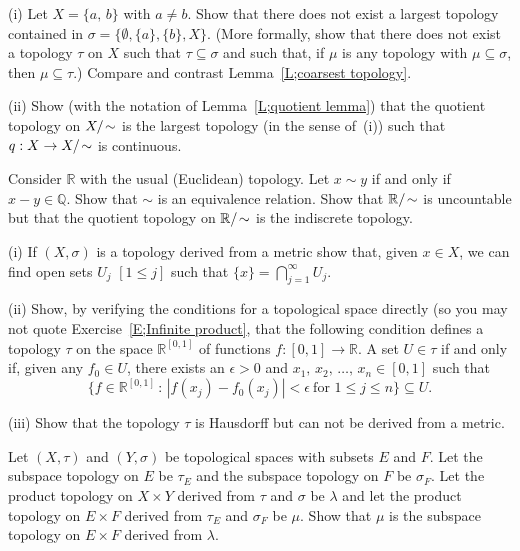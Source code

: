 \begin{exercise}\label{E;quotient remarks}
(i) Let $X=\{a,\,b\}$ with $a\neq b$. Show that there
does not exist a largest topology contained in 
$\sigma=\{\emptyset,\{a\},\{b\},X\}$. (More formally,
show that there does not exist a topology $\tau$
on $X$ such that $\tau\subseteq \sigma$ and
such that, if $\mu$ is any topology with $\mu\subseteq\sigma$,
then $\mu\subseteq \tau$.) Compare and contrast
Lemma~\ref{L;coarsest topology}.

(ii) Show (with the notation of Lemma~\ref{L;quotient lemma})
that the quotient topology on $X/\negthinspace\sim$ is the largest
topology (in the sense of~(i)) such that
$q:X\rightarrow X/\negthinspace\sim$ is continuous.
\end{exercise}
\begin{exercise}\label{E;quotient non Hausdorff}
Consider ${\mathbb R}$ with the usual (Euclidean)
topology. Let $x\sim y$ if and only if $x-y\in{\mathbb Q}$.
Show that $\sim$ is an equivalence relation. Show that
${\mathbb R}/\negthinspace\sim$ is uncountable but that the quotient
topology on ${\mathbb R}/\negthinspace\sim$ is the indiscrete topology.
\end{exercise}
\begin{exercise}\label{E;Hausdorff not metric}
(i) If $(X,\sigma)$ is a topology derived from a metric
show that, given $x\in X$, we can find open sets
$U_{j}$ $[1\leq j]$
such that $\{x\}=\bigcap_{j=1}^{\infty}U_{j}$.

(ii) Show, by verifying the conditions for a topological
space directly (so you may not quote Exercise~\ref{E;Infinite product}, 
that the following condition defines 
a topology $\tau$
on the space ${\mathbb R}^{[0,1]}$ of functions $f:[0,1]\rightarrow{\mathbb R}$.
A set $U\in\tau$ if and only if, given any $f_{0}\in U$,
there exists an $\epsilon>0$
and $x_{1},\,x_{2},\,\dots,\,x_{n}\in[0,1]$ such that
\[\{f\in {\mathbb R}^{[0,1]}\,:\,
|f(x_{j})-f_{0}(x_{j})|<\epsilon\ \text{for $1\leq j\leq n$}\}\subseteq U.\]

(iii) Show that the topology $\tau$ is Hausdorff
but can not be derived from a metric.
\end{exercise}
\begin{exercise}\label{E;Product subspace}
Let $(X,\tau)$ and $(Y,\sigma)$ be topological spaces
with subsets $E$ and $F$. Let the subspace topology
on $E$ be $\tau_{E}$ and  the subspace topology
on $F$ be $\sigma_{F}$. Let the product topology 
on $X\times Y$ derived from $\tau$ and $\sigma$
be $\lambda$ and let the product topology 
on $E\times F$ derived from $\tau_{E}$ and $\sigma_{F}$
be $\mu$. Show that $\mu$ is the subspace topology on $E\times F$
derived from $\lambda$. 
\end{exercise}

